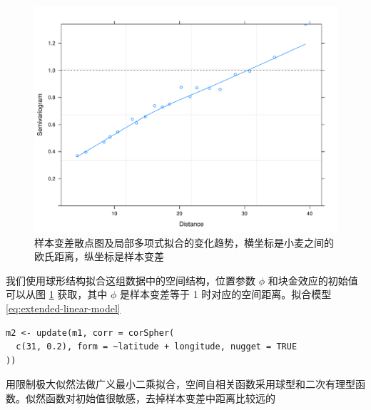 \documentclass[12pt,a4paper,UTF8,twoside]{book}
\theoremstyle{definition}
\theoremstyle{definition}
\theoremstyle{definition}
\theoremstyle{remark}
\begin{document}
\begin{figure}

{\centering \includegraphics[width=0.7\linewidth]{figures/Yields-Variogram} 

}

\caption{样本变差散点图及局部多项式拟合的变化趋势，横坐标是小麦之间的欧氏距离，纵坐标是样本变差}\label{fig:yields-variogram}
\end{figure}

我们使用球形结构拟合这组数据中的空间结构，位置参数 \(\phi\)
和块金效应的初始值可以从图 \ref{fig:yields-variogram} 获取，其中
\(\phi\) 是样本变差等于 1 时对应的空间距离。拟合模型
\eqref{eq:extended-linear-model}

\begin{verbatim}
m2 <- update(m1, corr = corSpher(
  c(31, 0.2), form = ~latitude + longitude, nugget = TRUE
))
\end{verbatim}

用限制极大似然法做广义最小二乘拟合，空间自相关函数采用球型和二次有理型函数。似然函数对初始值很敏感，去掉样本变差中距离比较远的
\end{document}
